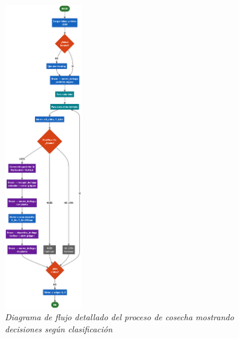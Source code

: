 \begin{figure}[H]
    \centering
    \includegraphics[width=0.3\textwidth]{imagenes/diagrama_flujo_cosecha.png}
    \caption{\textit{Diagrama de flujo detallado del proceso de cosecha mostrando decisiones según clasificación}}
    \label{fig:flujo_cosecha}
\end{figure}
